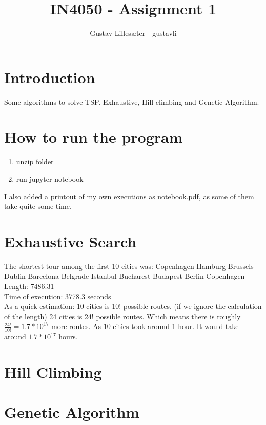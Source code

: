 \documentclass[12pt]{article}
\title{IN4050 - Assignment 1}
\author{Gustav Lillesæter - gustavli}
\begin{document}
\maketitle

\tableofcontents
\pagebreak


\section{Introduction}

Some algorithms to solve TSP. Exhaustive, Hill climbing and Genetic Algorithm.

\section{How to run the program}
\begin{enumerate}
\item unzip folder
\item run jupyter notebook
\end{enumerate}

I also added a printout of my own executions as notebook.pdf, as some of them take quite some time.

\section{Exhaustive Search}
The shortest tour among the first 10 cities was: Copenhagen \rightarrow Hamburg \rightarrow Brussels \rightarrow Dublin \rightarrow Barcelona \rightarrow Belgrade \rightarrow Istanbul \rightarrow Bucharest \rightarrow Budapest \rightarrow Berlin \rightarrow Copenhagen\\
Length: 7486.31\\
Time of execution: 3778.3 seconds\\

As a quick estimation:
10 cities is 10! possible routes. (if we ignore the calculation of the length)
24 cities is 24! possible routes. Which means there is roughly $\frac{24!}{10!} = 1.7*10^{17}$ more routes. As 10 cities took around 1 hour.  It would take around $1.7*10^{17}$ hours.

\section{Hill Climbing}

\section{Genetic Algorithm}
\end{document}
